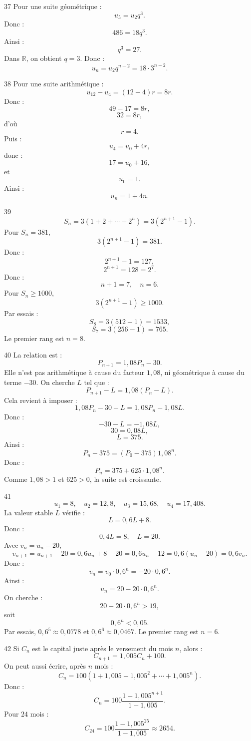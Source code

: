 \documentclass[11pt,a4paper]{article}
\newcommand{\R}{\mathbb{R}}
\begin{document}
\begin{solbox}{37}
Pour une suite géométrique :
\[
u_5=u_2q^3.
\]
Donc :
\[
486=18q^3.
\]
Ainsi :
\[
q^3=27.
\]
Dans \(\R\), on obtient \(q=3\). Donc :
\[
u_n=u_2q^{n-2}=18\cdot3^{n-2}.
\]
\end{solbox}

\begin{solbox}{38}
Pour une suite arithmétique :
\[
u_{12}-u_4=(12-4)r=8r.
\]
Donc :
\[
49-17=8r,
\]
\[
32=8r,
\]
d'où
\[
r=4.
\]
Puis :
\[
u_4=u_0+4r,
\]
donc :
\[
17=u_0+16,
\]
et
\[
u_0=1.
\]
Ainsi :
\[
u_n=1+4n.
\]
\end{solbox}

\begin{solbox}{39}
\[
S_n=3(1+2+\cdots+2^n)=3(2^{n+1}-1).
\]
Pour \(S_n=381\),
\[
3(2^{n+1}-1)=381.
\]
Donc :
\[
2^{n+1}-1=127,
\]
\[
2^{n+1}=128=2^7.
\]
Donc :
\[
n+1=7,\quad n=6.
\]
Pour \(S_n\geq1000\),
\[
3(2^{n+1}-1)\geq1000.
\]
Par essais :
\[
S_8=3(512-1)=1533,
\]
\[
S_7=3(256-1)=765.
\]
Le premier rang est \(n=8\).
\end{solbox}

\begin{solbox}{40}
La relation est :
\[
P_{n+1}=1{,}08P_n-30.
\]
Elle n'est pas arithmétique à cause du facteur \(1{,}08\), ni géométrique à cause du terme \(-30\).  
On cherche \(L\) tel que :
\[
P_{n+1}-L=1{,}08(P_n-L).
\]
Cela revient à imposer :
\[
1{,}08P_n-30-L=1{,}08P_n-1{,}08L.
\]
Donc :
\[
-30-L=-1{,}08L,
\]
\[
30=0{,}08L,
\]
\[
L=375.
\]
Ainsi :
\[
P_n-375=(P_0-375)1{,}08^n.
\]
Donc :
\[
P_n=375+625\cdot1{,}08^n.
\]
Comme \(1{,}08>1\) et \(625>0\), la suite est croissante.
\end{solbox}

\begin{solbox}{41}
\[
u_1=8,\quad u_2=12{,}8,\quad u_3=15{,}68,\quad u_4=17{,}408.
\]
La valeur stable \(L\) vérifie :
\[
L=0{,}6L+8.
\]
Donc :
\[
0{,}4L=8,\quad L=20.
\]
Avec \(v_n=u_n-20\),
\[
v_{n+1}=u_{n+1}-20=0{,}6u_n+8-20=0{,}6u_n-12=0{,}6(u_n-20)=0{,}6v_n.
\]
Donc :
\[
v_n=v_0\cdot0{,}6^n=-20\cdot0{,}6^n.
\]
Ainsi :
\[
u_n=20-20\cdot0{,}6^n.
\]
On cherche :
\[
20-20\cdot0{,}6^n>19,
\]
soit
\[
0{,}6^n<0{,}05.
\]
Par essais, \(0{,}6^5\approx0{,}0778\) et \(0{,}6^6\approx0{,}0467\). Le premier rang est \(n=6\).
\end{solbox}

\begin{solbox}{42}
Si \(C_n\) est le capital juste après le versement du mois \(n\), alors :
\[
C_{n+1}=1{,}005C_n+100.
\]
On peut aussi écrire, après \(n\) mois :
\[
C_n=100(1+1{,}005+1{,}005^2+\cdots+1{,}005^n).
\]
Donc :
\[
C_n=100\frac{1-1{,}005^{n+1}}{1-1{,}005}.
\]
Pour \(24\) mois :
\[
C_{24}=100\frac{1-1{,}005^{25}}{1-1{,}005}\approx2654.
\]
\end{solbox}
\end{document}
